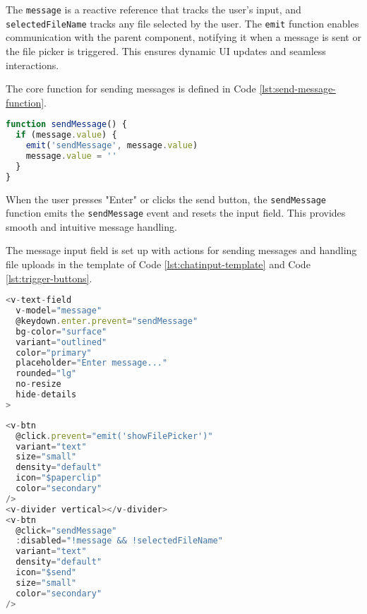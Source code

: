 The \texttt{message} is a reactive reference that tracks the user’s input, and \texttt{selectedFileName}
tracks any file selected by the user. The \texttt{emit}
function enables communication with the parent component, notifying it when a message is sent or the file picker is
triggered. This ensures dynamic UI updates and seamless interactions.

The core function for sending messages is defined in Code \ref{lst:send-message-function}.

\begin{lstlisting}[language=JavaScript, caption={Send Message Function (\texttt{ChatInput.vue})},
firstnumber=13,label={lst:send-message-function}]
function sendMessage() {
  if (message.value) {
    emit('sendMessage', message.value)
    message.value = ''
  }
}
\end{lstlisting}

When the user presses "Enter" or clicks the send button, the \texttt{sendMessage} function emits the
\texttt{sendMessage} event and resets the input field. This provides smooth and intuitive message handling.

The message input field is set up with actions for sending messages and handling file uploads in the template of Code
\ref{lst:chatinput-template} and Code \ref{lst:trigger-buttons}.

\begin{lstlisting}[language=JavaScript, caption={Message Input Field (\texttt{ChatInput.vue})},
firstnumber=23,label={lst:chatinput-template}]
<v-text-field
  v-model="message"
  @keydown.enter.prevent="sendMessage"
  bg-color="surface"
  variant="outlined"
  color="primary"
  placeholder="Enter message..."
  rounded="lg"
  no-resize
  hide-details
>
\end{lstlisting}

\begin{lstlisting}[language=JavaScript, caption={Trigger Buttons (\texttt{ChatInput.vue})},
firstnumber=47,label={lst:trigger-buttons}]
<v-btn
  @click.prevent="emit('showFilePicker')"
  variant="text"
  size="small"
  density="default"
  icon="$paperclip"
  color="secondary"
/>
<v-divider vertical></v-divider>
<v-btn
  @click="sendMessage"
  :disabled="!message && !selectedFileName"
  variant="text"
  density="default"
  icon="$send"
  size="small"
  color="secondary"
/>
\end{lstlisting}

